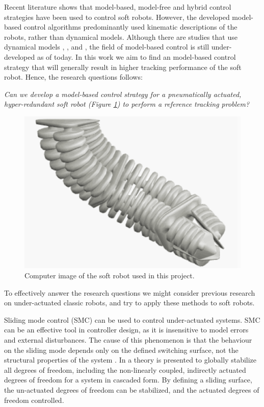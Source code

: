 Recent literature shows that model-based, model-free and hybrid control strategies have been used to control soft robots. However, the developed model-based control algorithms predominantly used kinematic descriptions of the robots, rather than dynamical models. Although there are studies that use dynamical models  \cite{falkenhahn2016dynamic}, \cite{della2020model}, and \cite{kapadia2011task}, the field of model-based control is still under-developed as of today. In this work we aim to find an model-based control strategy that will generally result in higher tracking performance of the soft robot. Hence, the research questions follows:



\textit{Can we develop a model-based control strategy for a pneumatically actuated, hyper-redundant soft robot (Figure \ref{fig:sorotoki}) to perform a reference tracking problem?}




\begin{figure}[H]
    \centering
    \includegraphics{Figures/sorotoki1.png}
    \caption{Computer image of the soft robot used in this project.}
    \label{fig:sorotoki}
\end{figure}


To effectively answer the research questions we might consider previous research on under-actuated classic robots, and try to apply these methods to soft robots.

Sliding mode control (SMC) can be used to control under-actuated systems. SMC can be an effective tool in controller design, as it is insensitive to model errors and external disturbances. The cause of this phenomenon is that the behaviour on the sliding mode depends only on the defined switching surface, not the structural properties of the system \cite{liu2013survey}. In \cite{xu2008sliding} a theory is presented to globally stabilize all degrees of freedom, including the non-linearly coupled, indirectly actuated degrees of freedom for a system in cascaded form. By defining a sliding surface, the un-actuated degrees of freedom can be stabilized, and the actuated degrees of freedom controlled.

